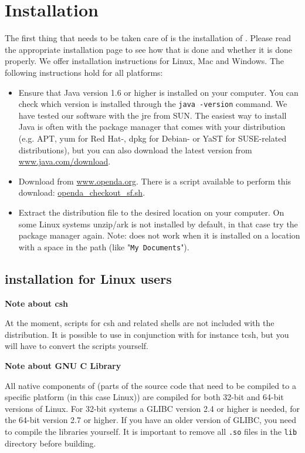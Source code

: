 \section{Installation}\label{sec:installation}
The first thing that needs to be taken care of is the installation of \oda. Please read the appropriate installation page to see how that is done and whether it is done properly. We offer installation instructions for Linux, Mac and Windows. The following instructions hold for all platforms: 
\begin{itemize}
\item Ensure that Java version 1.6 or higher is installed on your computer. You can check which version is installed through the \verb|java -version| command. We have tested our software with the jre from SUN. The easiest way to install Java is often with the package manager that comes with your distribution (e.g. APT, yum for Red Hat-, dpkg for Debian- or YaST for SUSE-related distributions), but you can also download the latest version from \href{http://www.java.com/download}{www.java.com/download}.
\item Download \oda from \href{http://www.openda.org}{www.openda.org}. There is a script available to perform this download: \href{http://www.openda.org/docu/openda_2.1/doc/usedoc/openda_checkout_sf.sh}{openda\_checkout\_sf.sh}.
\item Extract the \oda distribution file to the desired location on your computer. On some Linux systems unzip/ark is not installed by default, in that case try the package manager again.  Note: \oda does not work when it is installed on a location with a space in the path (like "\verb|My Documents|").
\end{itemize}

\subsection{\oda installation for Linux users}
\textbf{Note about csh}

At the moment, scripts for csh and related shells are not included with the \oda distribution. It is possible to use \oda in conjunction with for instance tcsh, but you will have to convert the scripts yourself.

\textbf{Note about GNU C Library}

All native components of \oda (parts of the source code that need to be compiled to a specific platform (in this case Linux)) are compiled for both 32-bit and 64-bit versions of Linux. For 32-bit systems a GLIBC version 2.4 or higher is needed, for the 64-bit version 2.7 or higher. If you have an older version of GLIBC, you need to compile the libraries yourself. It is important to remove all \verb|.so| files in the \verb|lib| directory before building. 

